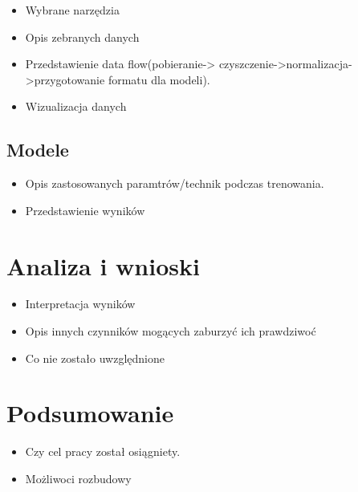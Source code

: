 \begin{itemize}
\item Wybrane narzędzia
\item Opis zebranych danych
\item Przedstawienie data flow(pobieranie-> czyszczenie->normalizacja->przygotowanie formatu dla modeli).
\item Wizualizacja danych
\end{itemize}


\section{Modele }
\label{cha:pierwszyDokument}

\begin{itemize}
\item Opis zastosowanych paramtrów/technik podczas trenowania.
\item Przedstawienie wyników 
\end{itemize}


\chapter{Analiza i wnioski }
\label{cha:pierwszyDokument}

\begin{itemize}
\item Interpretacja wyników
\item Opis innych czynników mogących zaburzyć ich prawdziwoć
\item Co nie zostało uwzględnione 
\end{itemize}


\chapter{Podsumowanie}
\label{cha:pierwszyDokument}

\begin{itemize}
\item Czy cel pracy został osiągniety.
\item Możliwoci rozbudowy
\end{itemize}
 





